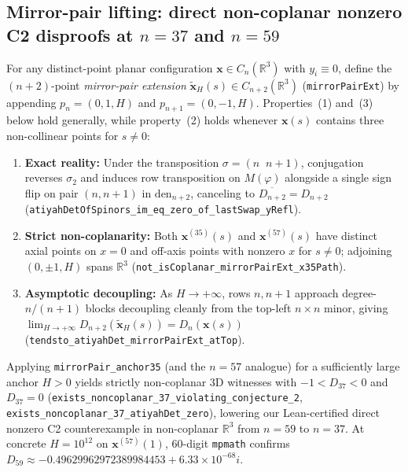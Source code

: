 \documentclass[11pt,reqno]{amsart}
\theoremstyle{remark}
\newcommand{\R}{\mathbb{R}}
\begin{document}
\subsection{Mirror-pair lifting: direct non-coplanar nonzero C2 disproofs at $n = 37$ and $n = 59$}
For any distinct-point planar configuration $\mathbf{x} \in C_n(\R^3)$ with $y_i \equiv 0$, define the $(n+2)$-point \emph{mirror-pair extension} $\widetilde{\mathbf{x}}_H(s) \in C_{n+2}(\R^3)$ (\texttt{mirrorPairExt}) by appending $p_n = (0, 1, H)$ and $p_{n+1} = (0, -1, H)$.
Properties~(1) and~(3) below hold generally, while property~(2) holds whenever $\mathbf{x}(s)$ contains three non-collinear points for $s \ne 0$:
\begin{enumerate}
  \item \textbf{Exact reality:} Under the transposition $\sigma = (n\;\; n+1)$, conjugation reverses $\sigma_2$ and induces row transposition on $M(\varphi)$ alongside a single sign flip on pair $(n, n+1)$ in $\mathrm{den}_{n+2}$, canceling to $\overline{D_{n+2}} = D_{n+2}$ (\texttt{atiyahDetOfSpinors\_im\_eq\_zero\_of\_lastSwap\_yRefl}).
  \item \textbf{Strict non-coplanarity:} Both $\mathbf{x}^{(35)}(s)$ and $\mathbf{x}^{(57)}(s)$ have distinct axial points on $x = 0$ and off-axis points with nonzero $x$ for $s \ne 0$; adjoining $(0, \pm 1, H)$ spans $\R^3$ (\texttt{not\_isCoplanar\_mirrorPairExt\_x35Path}).
  \item \textbf{Asymptotic decoupling:} As $H \to +\infty$, rows $n, n+1$ approach degree-$n/(n+1)$ blocks decoupling cleanly from the top-left $n \times n$ minor, giving $\lim_{H \to +\infty} D_{n+2}(\widetilde{\mathbf{x}}_H(s)) = D_n(\mathbf{x}(s))$ (\texttt{tendsto\_atiyahDet\_mirrorPairExt\_atTop}).
\end{enumerate}
Applying \texttt{mirrorPair\_anchor35} (and the $n = 57$ analogue) for a sufficiently large anchor $H > 0$ yields strictly non-coplanar 3D witnesses with $-1 < D_{37} < 0$ and $D_{37} = 0$ (\texttt{exists\_noncoplanar\_37\_violating\_conjecture\_2}, \texttt{exists\_noncoplanar\_37\_atiyahDet\_zero}), lowering our Lean-certified direct nonzero C2 counterexample in non-coplanar $\R^3$ from $n = 59$ to $n = 37$.
At concrete $H = 10^{12}$ on $\mathbf{x}^{(57)}(1)$, $60$-digit \texttt{mpmath} confirms $D_{59} \approx -0.49629962972389984453 + 6.33 \times 10^{-68} i$.
\end{document}
